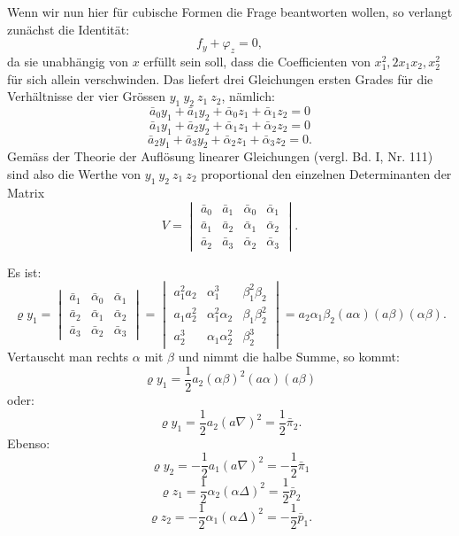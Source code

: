 Wenn wir nun hier für cubische Formen die Frage beantworten wollen, so
verlangt zunächst die Identität:
\[
f_y + \varphi_z = 0,
\]
da sie unabhängig von $x$ erfüllt sein soll, dass die Coefficienten
von $x_1^2, 2x_1x_2, x_2^2$ für sich allein verschwinden. Das liefert
drei Gleichungen ersten Grades für die Verhältnisse der vier Grössen
$y_1\ y_2\ z_1\ z_2$, nämlich:
\[
\bar a_0y_1 + \bar a_1y_2 + \bar\alpha_0z_1 + \bar\alpha_1z_2 = 0
\]
\[
\bar a_1y_1 + \bar a_2y_2 + \bar\alpha_1z_1 + \bar\alpha_2z_2 = 0
\]
\[
\bar a_2y_1 + \bar a_3y_2 + \bar\alpha_2z_1 + \bar\alpha_3z_2 = 0.
\]
Gemäss der Theorie der Auflösung linearer Gleichungen (vergl. Bd. I,
Nr. 111) sind also die Werthe von $y_1\ y_2\ z_1\ z_2$ proportional den
einzelnen Determinanten der Matrix
\[
V = \begin{vmatrix} \bar a_0 & \bar a_1 & \bar\alpha_0 & \bar\alpha_1 \\ \bar a_1 & \bar a_2 & \bar\alpha_1 & \bar\alpha_2 \\ \bar a_2 & \bar a_3 & \bar\alpha_2 & \bar\alpha_3 \end{vmatrix}.
\]



Es ist:
\[
\varrho y_1 = \begin{vmatrix} \bar a_1 & \bar\alpha_0 & \bar\alpha_1 \\ \bar a_2 & \bar\alpha_1 & \bar\alpha_2 \\ \bar a_3 & \bar\alpha_2 & \bar\alpha_3 \end{vmatrix} = \begin{vmatrix} a_1^2a_2 & \alpha_1^3 & \beta_1^2\beta_2 \\ a_1a_2^2 & \alpha_1^2\alpha_2 & \beta_1\beta_2^2 \\ a_2^3 & \alpha_1\alpha_2^2 & \beta_2^3 \end{vmatrix} = a_2\alpha_1\beta_2(a\alpha)(a\beta)(\alpha\beta).
\]
Vertauscht man rechts $\alpha$ mit $\beta$ und nimmt die halbe Summe,
so kommt:
\[
\varrho y_1 = \frac{1}{2}a_2(\alpha\beta)^2(a\alpha)(a\beta)
\]
oder:
\[
\varrho y_1 = \frac{1}{2}a_2(a\nabla)^2 = \frac{1}{2}\bar\pi_2.
\]
Ebenso:
\[
\varrho y_2 = -\frac{1}{2}a_1(a\nabla)^2 = -\frac{1}{2}\bar\pi_1
\]
\[
\varrho z_1 = \frac{1}{2}\alpha_2(\alpha\Delta)^2 = \frac{1}{2}\bar p_2
\]
\[
\varrho z_2 = -\frac{1}{2}\alpha_1(\alpha\Delta)^2 = -\frac{1}{2}\bar p_1.
\]

